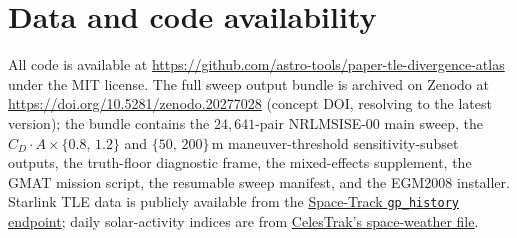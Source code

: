 \documentclass[10pt, letterpaper]{article}
\begin{document}
\begin{table}[ht]
  \centering
  \caption{Per-cell comparison of the main-text per-pair OLS slope
  $\hat{k}_{\mathrm{OLS}}$ (with $95\%$ satellite-level bootstrap
  percentile CI, identical procedure to Table~\ref{tab:powerlaw})
  against the linear mixed-effects fixed-effect slope
  $\hat{k}_{\mathrm{LME}}$ (with $1.96\,\mathrm{SE}$ Wald CI). The
  random-intercept SD $\hat\sigma_{\log_{10} A}$ is the LME estimate
  of the per-satellite scatter in $\log_{10} A$ that the bootstrap
  on $A$ absorbs implicitly. One row per
  (altitude shell $\times$ pooled generation $\times$ propagator)
  cell that reaches the convergence guardrails
  ($\ge 30$ pairs and $\ge 5$ satellites in the cell).}
  \label{tab:mixed-effects}
  \resizebox{\textwidth}{!}{}
\end{table}

\section*{Data and code availability}
\label{sec:availability}

All code is available at
\url{https://github.com/astro-tools/paper-tle-divergence-atlas}
under the MIT license. The full sweep output bundle is archived on
Zenodo at \url{https://doi.org/10.5281/zenodo.20277028} (concept DOI,
resolving to the latest version); the bundle contains the
$24{,}641$-pair NRLMSISE-00 main sweep, the $C_{D}\cdot A \times
\{0.8,\,1.2\}$ and $\{50,\,200\}$\,m maneuver-threshold
sensitivity-subset outputs, the truth-floor diagnostic frame,
the mixed-effects supplement, the GMAT mission script, the
resumable sweep manifest, and the EGM2008 installer. Starlink TLE
data is publicly available from the
\href{https://www.space-track.org}{Space-Track \texttt{gp\_history}
endpoint}; daily solar-activity indices are from
\href{https://celestrak.org/SpaceData/}{CelesTrak's space-weather file}.



\end{document}
